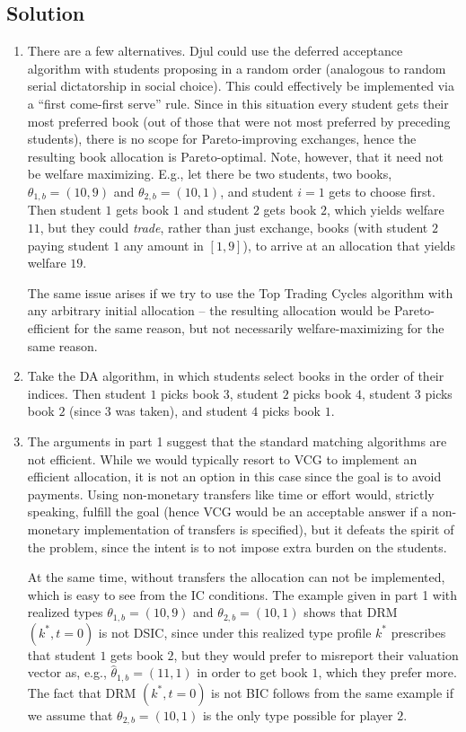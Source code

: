 \documentclass[a4paper]{article}
\newif\ifsolutions
\begin{document}
\ifsolutions
\subsection*{Solution}
\begin{enumerate}
	\item There are a few alternatives. Djul could use the deferred acceptance algorithm with students proposing in a random order (analogous to random serial dictatorship in social choice). This could effectively be implemented via a ``first come-first serve'' rule. Since in this situation every student gets their most preferred book (out of those that were not most preferred by preceding students), there is no scope for Pareto-improving exchanges, hence the resulting book allocation is Pareto-optimal. Note, however, that it need not be welfare maximizing. E.g., let there be two students, two books, $\theta_{1,b} = (10,9)$ and $\theta_{2,b} = (10,1)$, and student $i=1$ gets to choose first. Then student $1$ gets book $1$ and student $2$ gets book $2$, which yields welfare $11$, but they could \emph{trade}, rather than just exchange, books (with student $2$ paying student $1$ any amount in $[1,9]$), to arrive at an allocation that yields welfare $19$.
	
	The same issue arises if we try to use the Top Trading Cycles algorithm with any arbitrary initial allocation -- the resulting allocation would be Pareto-efficient for the same reason, but not necessarily welfare-maximizing for the same reason.
	
	\item Take the DA algorithm, in which students select books in the order of their indices. Then student $1$ picks book $3$, student $2$ picks book $4$, student $3$ picks book $2$ (since $3$ was taken), and student $4$ picks book $1$.
	
	\item The arguments in part 1 suggest that the standard matching algorithms are not efficient. While we would typically resort to VCG to implement an efficient allocation, it is not an option in this case since the goal is to avoid payments. Using non-monetary transfers like time or effort would, strictly speaking, fulfill the goal (hence VCG would be an acceptable answer if a non-monetary implementation of transfers is specified), but it defeats the spirit of the problem, since the intent is to not impose extra burden on the students.
	
	At the same time, without transfers the allocation can not be implemented, which is easy to see from the IC conditions. The example given in part 1 with realized types $\theta_{1,b} = (10,9)$ and $\theta_{2,b} = (10,1)$ shows that DRM $(k^*,t=0)$ is not DSIC, since under this realized type profile $k^*$ prescribes that student $1$ gets book $2$, but they would prefer to misreport their valuation vector as, e.g., $\hat{\theta}_{1,b} =(11,1)$ in order to get book $1$, which they prefer more. The fact that DRM $(k^*,t=0)$ is not BIC follows from the same example if we assume that $\theta_{2,b} = (10,1)$ is the only type possible for player $2$.
	

\end{enumerate}
\end{document}
